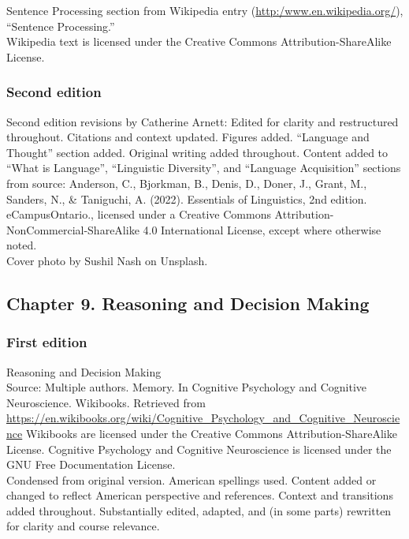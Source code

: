 \documentclass[
]{krantz}
\begin{document}
Sentence Processing section from Wikipedia entry (\url{http:/www.en.wikipedia.org/}), ``Sentence Processing.''\\
Wikipedia text is licensed under the Creative Commons Attribution-ShareAlike License.

\subsubsection*{Second edition}\label{second-edition-7}


Second edition revisions by Catherine Arnett: Edited for clarity and restructured throughout. Citations and context updated. Figures added. ``Language and Thought'' section added. Original writing added throughout. Content added to ``What is Language'', ``Linguistic Diversity'', and ``Language Acquisition'' sections from source: Anderson, C., Bjorkman, B., Denis, D., Doner, J., Grant, M., Sanders, N., \& Taniguchi, A. (2022). Essentials of Linguistics, 2nd edition. eCampusOntario., licensed under a Creative Commons Attribution-NonCommercial-ShareAlike 4.0 International License, except where otherwise noted.\\

Cover photo by Sushil Nash on Unsplash.

\subsection*{Chapter 9. Reasoning and Decision Making}\label{chapter-9.-reasoning-and-decision-making}


\subsubsection*{First edition}\label{first-edition-9}


Reasoning and Decision Making\\
Source: Multiple authors. Memory. In Cognitive Psychology and Cognitive Neuroscience. Wikibooks. Retrieved from \url{https://en.wikibooks.org/wiki/Cognitive_Psychology_and_Cognitive_Neuroscience}
Wikibooks are licensed under the Creative Commons Attribution-ShareAlike License.
Cognitive Psychology and Cognitive Neuroscience is licensed under the GNU Free Documentation License.\\
Condensed from original version. American spellings used. Content added or changed to reflect American perspective and references. Context and transitions added throughout. Substantially edited, adapted, and (in some parts) rewritten for clarity and course relevance.
\end{document}
